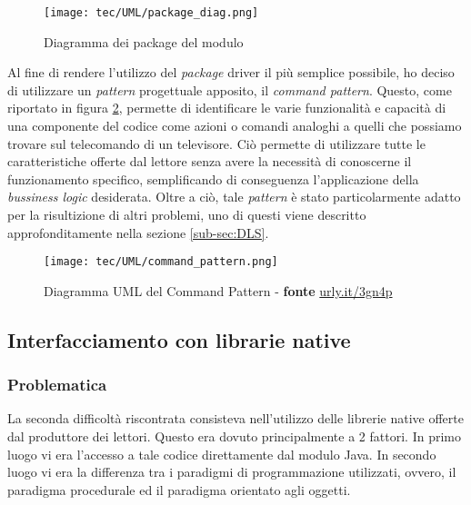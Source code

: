 \begin{figure}[!h] 
    \centering 
    \texttt{[image: tec/UML/package\_diag.png]} 
    \caption{Diagramma dei package del modulo}
    \label{package_diag}
\end{figure}

Al fine di rendere l'utilizzo del \emph{package} driver il più semplice possibile, ho deciso di utilizzare un \emph{pattern} progettuale
apposito, il \emph{command pattern}. Questo, come riportato in figura \ref{command_pattern}, permette di identificare le varie
funzionalità e capacità di una componente del codice come azioni o comandi analoghi a quelli che possiamo trovare sul telecomando
di un televisore. Ciò permette di utilizzare tutte le caratteristiche offerte dal lettore senza avere la necessità di conoscerne il
funzionamento specifico, semplificando di conseguenza l'applicazione della \emph{bussiness logic} desiderata.
Oltre a ciò, tale \emph{pattern} è stato particolarmente adatto per la risultizione di altri problemi, uno di questi viene descritto
approfonditamente nella sezione \ref{sub-sec:DLS}.


\begin{figure}[!h] 
    \centering 
    \texttt{[image: tec/UML/command\_pattern.png]} 
    \caption{Diagramma UML del Command Pattern - \textbf{fonte} \url{urly.it/3gn4p}}
    \label{command_pattern}
\end{figure}

\subsection{Interfacciamento con librarie native}
\subsubsection*{Problematica}
La seconda difficoltà riscontrata consisteva nell'utilizzo delle librerie native offerte dal produttore dei lettori.
Questo era dovuto principalmente a 2 fattori. In primo luogo vi era l'accesso a tale codice direttamente dal modulo Java.
In secondo luogo vi era la differenza tra i paradigmi di programmazione utilizzati, ovvero, il paradigma procedurale ed il paradigma
orientato agli oggetti. 

